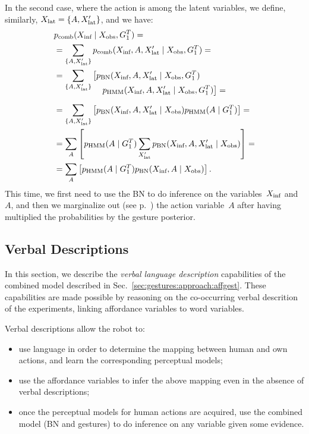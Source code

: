 In the second case, where the action is among the latent variables, we define, similarly, $X_\text{lat} = \{A, X_\text{lat}^\prime\}$, and we have:
\begin{align} \label{eq:pcomb_inf_excludes_action}
  & \pcomb(\xinf \given \xobs, G_1^T) = \nonumber \\
  &= \sum_{\{A,\xlat^\prime\}} \pcomb(\xinf, A, \xlat^\prime \given \xobs, G_1^T)= \nonumber \\
  &= \sum_{\{A,\xlat^\prime\}} \left[\pbn(\xinf, A, \xlat^\prime \given \xobs, G_1^T)\right. \nonumber \\[-4mm]
    & \mspace{100mu} \left.\phmm(\xinf, A, \xlat^\prime \given \xobs, G_1^T)\right]= \nonumber \\[2mm]
  &= \sum_{\{A,\xlat^\prime\}} \left[\pbn(\xinf, A, \xlat^\prime \given \xobs) \phmm(A \given G_1^T)\right]= \nonumber \\
  &= \sum_{A}\left[\phmm(A \given G_1^T)\sum_{\xlat^\prime} \pbn(\xinf, A, \xlat^\prime \given \xobs)\right]= \nonumber \\
  &= \sum_{A}\left[\phmm(A \given G_1^T) \pbn(\xinf, A \given \xobs)\right].
\end{align}
This time, we first need to use the \ac{BN} to do inference on the variables~$X_\text{inf}$ and~$A$, and then we marginalize out (see p.~\pageref{para:marginalization}) the action variable~$A$ after having multiplied the probabilities by the gesture posterior.

\subsection{Verbal Descriptions}
\label{sec:gestures:approach:verbal}

In this section, we describe the \emph{verbal language description} capabilities of the combined model described in Sec.~\ref{sec:gestures:approach:affgest}.
These capabilities are made possible by reasoning on the co-occurring verbal descrition of the experiments, linking affordance variables to word variables.

Verbal descriptions allow the robot to:
\begin{itemize}
\item use language in order to determine the mapping between human and own actions, and learn the corresponding perceptual models;

\item use the affordance variables to infer the above mapping even in the absence of verbal descriptions;

\item once the perceptual models for human actions are acquired, use the combined model (\ac{BN} and gestures) to do inference on any variable given some evidence.
\end{itemize}

